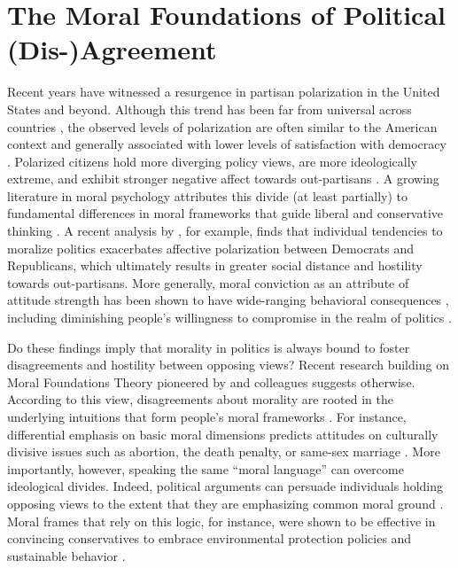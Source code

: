 \section{The Moral Foundations of Political (Dis-)Agreement}

Recent years have witnessed a resurgence in partisan polarization in the United States and beyond. Although this trend has been far from universal across countries \citep{gidron2020american,boxell2022cross,garzia2023affective}, the observed levels of polarization are often similar to the American context \citep{reiljan2020fear} and generally associated with lower levels of satisfaction with democracy \citep{wagner2021affective}. Polarized citizens hold more diverging policy
views, are more ideologically extreme, and exhibit stronger negative affect towards out-partisans \citep{hetherington2001resurgent, abramowitz2008polarization, iyengar2012affect, mason2014disrespectfully, huddy2015expressive, iyengar2015fear}. A growing literature in moral psychology attributes this divide (at least partially) to fundamental differences in moral frameworks that guide liberal and conservative thinking \citep[e.g.,][]{haidt2012righteous,graham2013moral}. A recent analysis by \citet{garrett2018moral}, for example, finds that individual tendencies to moralize politics exacerbates affective polarization between Democrats and Republicans, which ultimately results in greater social distance and hostility towards out-partisans. More generally, moral conviction as an attribute of attitude strength has been shown to have wide-ranging behavioral consequences \citep{skitka2005moral,skitka2014social}, including diminishing people's willingness to compromise in the realm of politics \citep{ryan2014reconsidering,ryan2017no}.

Do these findings imply that morality in politics is always bound to foster disagreements and hostility between opposing views? Recent research building on Moral Foundations Theory pioneered by \citet{haidt2007new} and colleagues suggests otherwise. According to this view, disagreements about morality are rooted in the underlying intuitions that form people's moral frameworks \citep{haidt2012righteous}. For instance, differential emphasis on basic moral dimensions predicts attitudes on culturally divisive issues such as abortion, the death penalty, or same-sex marriage \citep{koleva2012tracing}. More importantly, however, speaking the same ``moral language'' can overcome ideological divides. Indeed, political arguments can persuade individuals holding opposing views to the extent that they are emphasizing common moral ground \citep[e.g.,][]{day2014shifting,feinberg2015gulf}. Moral frames that rely on this logic, for instance, were shown to be effective in convincing conservatives to embrace environmental protection policies and sustainable behavior \citep{kidwell2013getting,feinberg2013moral}.

